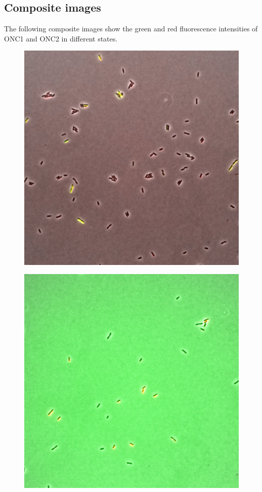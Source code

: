 \documentclass[english,11pt,a4paper]{article}
\begin{document}
\subsection{Composite images}
The following composite images show the green and red fluorescence intensities of ONC1 and ONC2 in different states. 

\begin{figure}[hbtp]
\centering
	\begin{minipage}{.5\textwidth}
  		\centering
  		\includegraphics[width=.9\linewidth]{greenstate008Composite.jpg}
  		\label{fig:onc1GreenStateComposite}
	\end{minipage}%
	\begin{minipage}{.5\textwidth}
  		\centering
  		\includegraphics[width=.9\linewidth]{redstate014Composite.jpg}
  		\label{fig:onc1RedStateComposite}  
	\end{minipage}
\end{figure}
\end{document}
